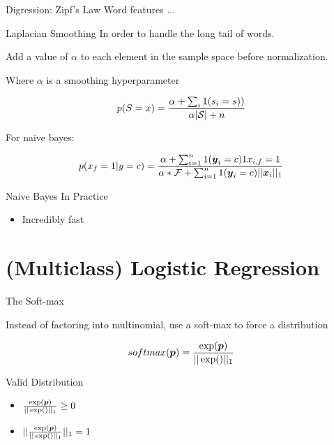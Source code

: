 \documentclass{beamer}
\begin{document}
\begin{frame}{Digression: Zipf's Law}
  Word features ... 
\end{frame}

\begin{frame}{Laplacian Smoothing}
  In order to handle the long tail of words. 
  
  Add a value of $\alpha$ to each element in the sample space before normalization.
  
  Where $\alpha$ is a smoothing hyperparameter 

  \[p(S=x)= \frac{\alpha + \sum_{i} 1(s_i =s))}{\alpha |\mathcal{S}| + n}  \]

  
  For naive bayes:

  \[p(x_f=1 | y=c) = \frac{\alpha + \sum_{i = 1}^n 1(\boldsymbol{y}_i = c) 1{x_{i,f} = 1}}{\alpha * \mathcal{F} + \sum_{i = 1}^n 1(\boldsymbol{y}_i = c) ||\boldsymbol{x}_i ||_1}  \]
\end{frame}

  
  


\begin{frame}{Naive Bayes In Practice}
  
  \begin{itemize}
  \item Incredibly fast
  \end{itemize}
\end{frame}

\section{(Multiclass) Logistic Regression}

\begin{frame}{The Soft-max}

  Instead of factoring into multinomial, use a soft-max to force a distribution
  
  \[softmax(\boldsymbol{p}) = \frac{\exp(\boldsymbol{p})}{||\exp(\bold)||_1}  \]

  Valid Distribution 

  \begin{itemize}
  \item $\frac{\exp(\boldsymbol{p})}{||\exp(\bold)||_1} \geq 0$ 
  \item $||\frac{\exp(\boldsymbol{p})}{||\exp(\bold)||_1}||_1 = 1$ 
  \end{itemize}


\end{frame}
\end{document}
